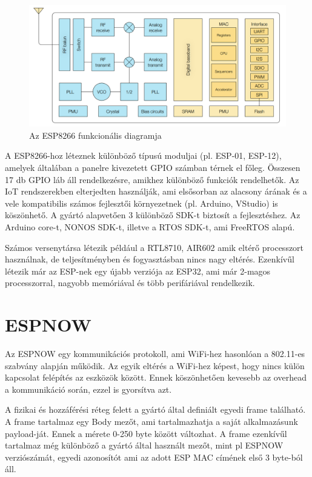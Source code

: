 \begin{figure}[!ht]
    \centering
    \includegraphics[width=150mm, keepaspectratio]{figures/esp8266funcdiag.png}
    \caption{Az ESP8266 funkcionális diagramja}
    \label{fig:TeXstudio}
\end{figure}

A ESP8266-hoz léteznek különböző típusú moduljai (pl. ESP-01, ESP-12), amelyek általában a panelre kivezetett GPIO számban térnek el főleg. Összesen 17 db GPIO láb áll rendelkezésre, amikhez különböző funkciók rendelhetők.
Az IoT rendszerekben elterjedten használják, ami elsősorban az alacsony árának és a vele kompatibilis számos fejlesztői környezetnek (pl. Arduino, VStudio) is köszönhető. A gyártó alapvetően 3 különböző SDK-t biztosít a fejlesztéshez. Az Arduino core-t, NONOS SDK-t, illetve a RTOS SDK-t, ami FreeRTOS alapú.

Számos versenytársa létezik például a RTL8710, AIR602 amik eltérő processzort használnak, de teljesítményben és fogyasztásban nincs nagy eltérés. Ezenkívűl létezik már az ESP-nek egy újabb verziója az ESP32, ami már 2-magos processzorral, nagyobb memóriával és több perifáriával rendelkezik.



\section{ESPNOW}
Az ESPNOW egy kommunikációs protokoll, ami WiFi-hez hasonlóan a 802.11-es szabvány alapján működik. Az egyik eltérés a WiFi-hez képest, hogy nincs külön kapcsolat felépítés az eszközök között. Ennek köszönhetően kevesebb az overhead a kommunikáció során, ezzel is gyorsítva azt.

A fizikai és hozzáférési réteg felett a gyártó által definiált egyedi frame található. A frame tartalmaz egy Body mezőt, ami tartalmazhatja a saját alkalmazásunk payload-ját. Ennek a mérete 0-250 byte között változhat. A frame ezenkívűl tartalmaz még különböző a gyártó által használt mezőt, mint pl ESPNOW verziószámát, egyedi azonosítót ami az adott ESP MAC címének első 3 byte-ból áll.

